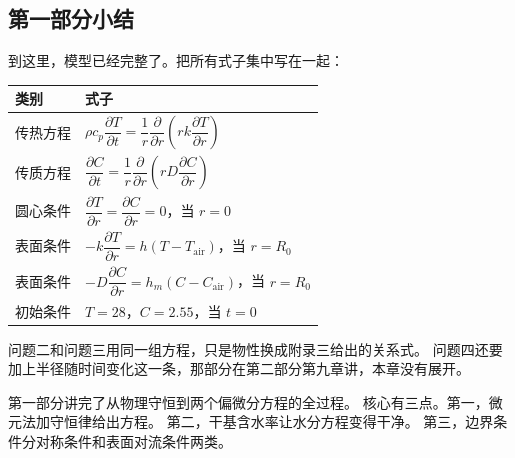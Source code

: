 \subsection{第一部分小结}

到这里，模型已经完整了。把所有式子集中写在一起：

\begin{center}
\begin{tabular}{@{}ll@{}}
\toprule
类别 & 式子 \\
\midrule
传热方程 & $\rho c_p\dfrac{\partial T}{\partial t}=\dfrac{1}{r}\dfrac{\partial}{\partial r}\left(rk\dfrac{\partial T}{\partial r}\right)$ \\
传质方程 & $\dfrac{\partial C}{\partial t}=\dfrac{1}{r}\dfrac{\partial}{\partial r}\left(rD\dfrac{\partial C}{\partial r}\right)$ \\
圆心条件 & $\dfrac{\partial T}{\partial r}=\dfrac{\partial C}{\partial r}=0$，当 $r=0$ \\
表面条件 & $-k\dfrac{\partial T}{\partial r}=h\left(T-T_{\mathrm{air}}\right)$，当 $r=R_0$ \\
表面条件 & $-D\dfrac{\partial C}{\partial r}=h_m\left(C-C_{\mathrm{air}}\right)$，当 $r=R_0$ \\
初始条件 & $T=28$，$C=2.55$，当 $t=0$ \\
\bottomrule
\end{tabular}
\end{center}

问题二和问题三用同一组方程，只是物性换成附录三给出的关系式。
问题四还要加上半径随时间变化这一条，那部分在第二部分第九章讲，本章没有展开。

\keypoint
第一部分讲完了从物理守恒到两个偏微分方程的全过程。
核心有三点。第一，微元法加守恒律给出方程。
第二，干基含水率让水分方程变得干净。
第三，边界条件分对称条件和表面对流条件两类。
